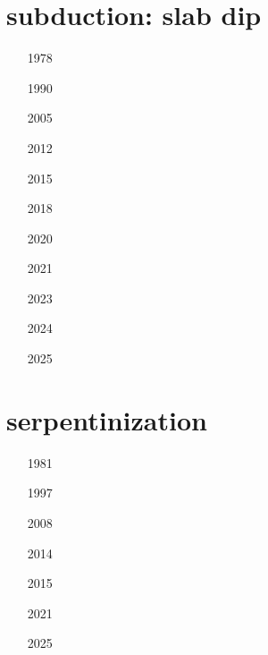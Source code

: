 \section{subduction: slab dip}

\begin{small}
\begin{itemize}
\item[1978] 
\item[1990] 
\item[2005] 
\item[2012] 
\item[2015] 
\item[2018] 
\item[2020] 
\item[2021]  \\ 
\item[2023] 
\item[2024] 
\item[2025]  \\ 
\end{itemize}
\end{small}

\section{serpentinization}

\begin{small}
\begin{itemize}
\item[1981] 
\item[1997] 
\\
\item[2008] 
\item[2014] 
\item[2015] 
\item[2021] 
\item[2025] 
\\
\end{itemize}
\end{small}






